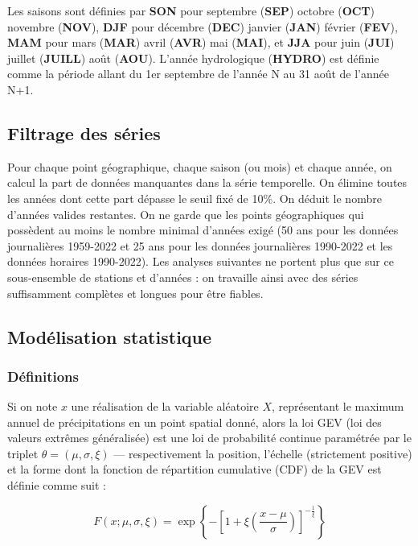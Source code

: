 \documentclass[
  article,
  nofooter,
  noheadings]{jss}
\begin{document}
Les saisons sont définies par \textbf{SON} pour septembre (\textbf{SEP})
octobre (\textbf{OCT}) novembre (\textbf{NOV}), \textbf{DJF} pour
décembre (\textbf{DEC}) janvier (\textbf{JAN}) février (\textbf{FEV}),
\textbf{MAM} pour mars (\textbf{MAR}) avril (\textbf{AVR}) mai
(\textbf{MAI}), et \textbf{JJA} pour juin (\textbf{JUI}) juillet
(\textbf{JUILL}) août (\textbf{AOU}). L'année hydrologique
(\textbf{HYDRO}) est définie comme la période allant du 1er septembre de
l'année N au 31 août de l'année N+1.

\subsection{Filtrage des séries}\label{filtrage-des-suxe9ries}

Pour chaque point géographique, chaque saison (ou mois) et chaque année,
on calcul la part de données manquantes dans la série temporelle. On
élimine toutes les années dont cette part dépasse le seuil fixé de 10\%.
On déduit le nombre d'années valides restantes. On ne garde que les
points géographiques qui possèdent au moins le nombre minimal d'années
exigé (50 ans pour les données journalières 1959-2022 et 25 ans pour les
données journalières 1990-2022 et les données horaires 1990-2022). Les
analyses suivantes ne portent plus que sur ce sous‑ensemble de stations
et d'années : on travaille ainsi avec des séries suffisamment complètes
et longues pour être fiables.

\subsection{Modélisation statistique}\label{moduxe9lisation-statistique}

\subsubsection{Définitions}\label{duxe9finitions}

Si on note \(x\) une réalisation de la variable aléatoire \(X\),
représentant le maximum annuel de précipitations en un point spatial
donné, alors la loi GEV (loi des valeurs extrêmes généralisée) est une
loi de probabilité continue paramétrée par le triplet
\(\theta = (\mu, \sigma, \xi)\) --- respectivement la position,
l'échelle (strictement positive) et la forme dont la fonction de
répartition cumulative (CDF) de la GEV est définie comme suit :

\[
F(x;\mu ,\sigma ,\xi ) = \exp \left\{ -\left[ 1 + \xi \left( \frac{x - \mu}{\sigma} \right) \right]^{-\frac{1}{\xi}} \right\}
\]
\end{document}
